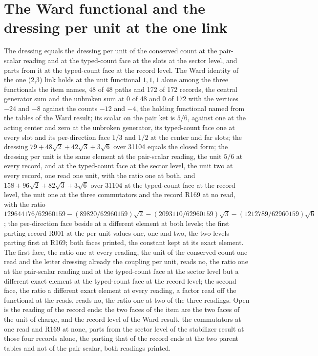 \section{The Ward functional and the dressing per unit at the one link}\label{mod:V-1-D541806-w-wdfu}
\begin{chwall}\label{box:V-1-D541806-w-wdfu:1}
The dressing equals the dressing per unit of the conserved count at the pair-scalar reading and at the typed-count face at the slots at the sector level, and parts from it at the typed-count face at the record level. The Ward identity of the one (2,3) link holds at the unit functional $1,1,1$ alone among the three functionals the item names, 48 of 48 paths and 172 of 172 records, the central generator sum and the unbroken sum at 0 of 48 and 0 of 172 with the vertices $-24$ and $-8$ against the counts $-12$ and $-4$, the holding functional named from the tables of the Ward result; its scalar on the pair ket is $5/6$, against one at the acting center and zero at the unbroken generator, its typed-count face one at every slot and its per-direction face $1/3$ and $1/2$ at the center and far slots; the dressing $79 + 48\sqrt{2} + 42\sqrt{3} + 3\sqrt{6}$ over 31104 equals the closed form; the dressing per unit is the same element at the pair-scalar reading, the unit $5/6$ at every record, and at the typed-count face at the sector level, the unit two at every record, one read one unit, with the ratio one at both, and $158 + 96\sqrt{2} + 82\sqrt{3} + 3\sqrt{6}$ over 31104 at the typed-count face at the record level, the unit one at the three commutators and the record R169 at no read, with the ratio $129644176/62960159 - (89820/62960159)\sqrt{2} - (2093110/62960159)\sqrt{3} - (1212789/62960159)\sqrt{6}$; the per-direction face beside at a different element at both levels; the first parting record R001 at the per-unit values one, one and two, the two levels parting first at R169; both faces printed, the constant kept at its exact element.
The first face, the ratio one at every reading, the unit of the conserved count one read and the letter dressing already the coupling per unit, reads no, the ratio one at the pair-scalar reading and at the typed-count face at the sector level but a different exact element at the typed-count face at the record level; the second face, the ratio a different exact element at every reading, a factor read off the functional at the reads, reads no, the ratio one at two of the three readings. Open is the reading of the record ends: the two faces of the item are the two faces of the unit of charge, and the record level of the Ward result, the commutators at one read and R169 at none, parts from the sector level of the stabilizer result at those four records alone, the parting that of the record ends at the two parent tables and not of the pair scalar, both readings printed.
\end{chwall}
